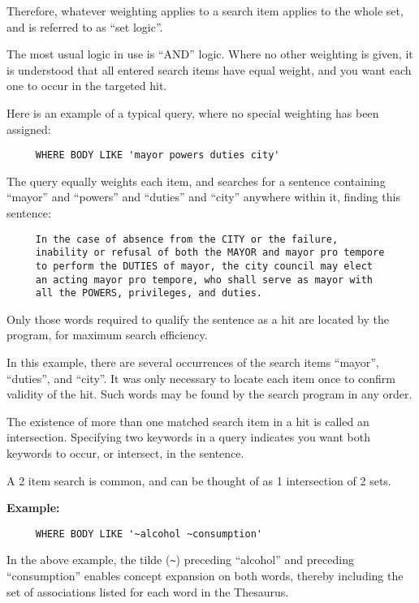 Therefore, whatever weighting applies to a search item applies to the
whole set, and is referred to as ``set logic''.

The most usual logic in use is ``AND'' logic.  Where no other
weighting is given, it is understood that all entered search items
have equal weight, and you want each one to occur in the targeted hit.

Here is an example of a typical query, where no special weighting has
been assigned:

\begin{verbatim}
     WHERE BODY LIKE 'mayor powers duties city'
\end{verbatim}

The query equally weights each item, and searches for a sentence
containing ``mayor'' and ``powers'' and ``duties'' and ``city''
anywhere within it, finding this sentence:

\begin{verbatim}
     In the case of absence from the CITY or the failure,
     inability or refusal of both the MAYOR and mayor pro tempore
     to perform the DUTIES of mayor, the city council may elect
     an acting mayor pro tempore, who shall serve as mayor with
     all the POWERS, privileges, and duties.
\end{verbatim}

Only those words required to qualify the sentence as a hit are located
by the program, for maximum search efficiency.

In this example, there are several occurrences of the search items
``mayor'', ``duties'', and ``city''.  It was only necessary to locate
each item once to confirm validity of the hit.  Such words may be
found by the search program in any order.

The existence of more than one matched search item in a hit is called
an intersection.  Specifying two keywords in a query indicates you
want both keywords to occur, or intersect, in the sentence.

A 2 item search is common, and can be thought of as 1 intersection of
2 sets.

{\bf Example:}
\begin{verbatim}
     WHERE BODY LIKE '~alcohol ~consumption'
\end{verbatim}

In the above example, the tilde (\verb`~`) preceding ``alcohol'' and
preceding ``consumption'' enables concept expansion on both words,
thereby including the set of associations listed for each word in the
Thesaurus.

